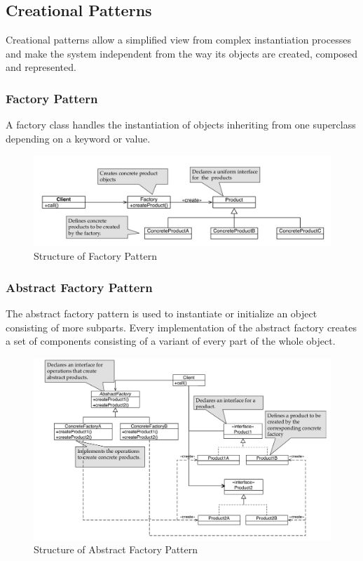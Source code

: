 \subsection{Creational Patterns}
Creational patterns allow a simplified view from complex instantiation processes and make the system independent from the way its objects are created, composed and represented.

\subsubsection{Factory Pattern}
A factory class handles the instantiation of objects inheriting from one superclass depending on a keyword or value.
\begin{figure}[h]
	\centering
	\includegraphics[width=\linewidth]{images/pattern_factory.png}
	\caption{Structure of Factory Pattern}
\end{figure}
\newpage

\subsubsection{Abstract Factory Pattern}
The abstract factory pattern is used to instantiate or initialize an object consisting of more subparts.
Every implementation of the abstract factory creates a set of components consisting of a variant of every part of the whole object.

\begin{figure}[h]
	\centering
	\includegraphics[width=\linewidth]{images/pattern_abstract_factory.png}
	\caption{Structure of Abstract Factory Pattern}
\end{figure}
\newpage
